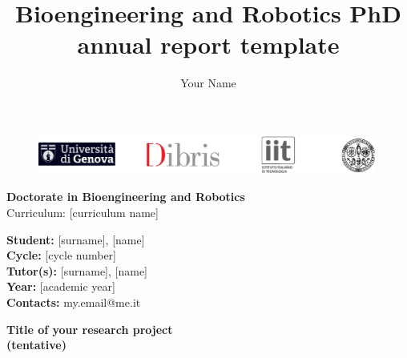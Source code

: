 \documentclass[11pt,a4paper]{article}
\author{Your Name}
\title{Bioengineering and Robotics PhD annual report template}
\begin{document}
\begin{figure}[t]
	\centering
	\includegraphics[width=0.99\textwidth]{logos/top_logos.pdf}
\end{figure}
\hphantom{h}\vspace{1.3cm}


\begin{center}
	
\LARGE{\textbf{Doctorate in Bioengineering and Robotics }\vspace{0.4cm}\\
Curriculum: [curriculum name]}

\end{center}

\begin{flushleft}
\vspace{1.5cm}
\large{\textbf{Student: }}\large{{[surname], [name]}}\vspace{0.2cm}\\
\large{\textbf{Cycle: }}\large{[cycle number]}\vspace{0.2cm}\\
\large{\textbf{Tutor(s): }}\large{{[surname], [name]}}\vspace{0.2cm}\\
\large{\textbf{Year: }}\large{[academic year]}\vspace{0.2cm}\\
\large{\textbf{Contacts: }}\large{{my.email@me.it}}
\end{flushleft}
\clearpage
\begin{center}
	\textbf{\normalsize{Title of your research project\\ (tentative)}}
\end{center}









\cleardoublepage



\end{document}
